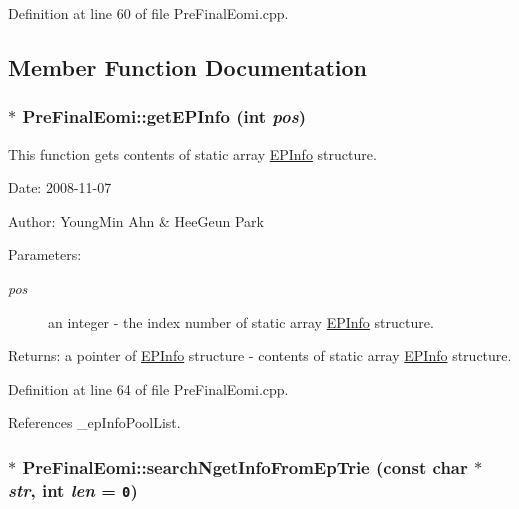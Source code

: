 Definition at line 60 of file PreFinalEomi.cpp.

\subsection{Member Function Documentation}
\hypertarget{classkmaOrange_1_1PreFinalEomi_1b0f2ee161c2e9196ab4170cd3cb6d58}{
\subsubsection[{getEPInfo}]{ $\ast$ PreFinalEomi::getEPInfo (int {\em pos})}}
\label{classkmaOrange_1_1PreFinalEomi_1b0f2ee161c2e9196ab4170cd3cb6d58}


This function gets contents of static array \hyperlink{structkmaOrange_1_1EPInfo}{EPInfo} structure. 

\begin{Desc}
\item[Date:]2008-11-07 \end{Desc}
\begin{Desc}
\item[Author:]YoungMin Ahn \& HeeGeun Park \end{Desc}
\begin{Desc}
\item[Parameters:]
\begin{description}
\item[{\em pos}]an integer - the index number of static array \hyperlink{structkmaOrange_1_1EPInfo}{EPInfo} structure. \end{description}
\end{Desc}
\begin{Desc}
\item[Returns:]a pointer of \hyperlink{structkmaOrange_1_1EPInfo}{EPInfo} structure - contents of static array \hyperlink{structkmaOrange_1_1EPInfo}{EPInfo} structure. \end{Desc}


Definition at line 64 of file PreFinalEomi.cpp.

References \_\-epInfoPoolList.\hypertarget{classkmaOrange_1_1PreFinalEomi_cf038ba240b1357550799a6c1965eb95}{
\subsubsection[{searchNgetInfoFromEpTrie}]{ $\ast$ PreFinalEomi::searchNgetInfoFromEpTrie (const char $\ast$ {\em str}, \/  int {\em len} = {\tt 0})}}
\label{classkmaOrange_1_1PreFinalEomi_cf038ba240b1357550799a6c1965eb95}


